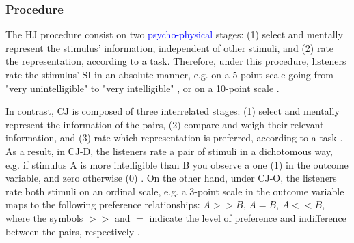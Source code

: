 \subsubsection{Procedure} \label{ss_sect:proc}
%
The HJ procedure consist on two \textcolor{blue}{psycho-physical} stages: (1) select and mentally represent the stimulus' information, independent of other stimuli, and (2) rate the representation, according to a task. Therefore, under this procedure, listeners rate the stimulus' SI in an absolute manner, e.g. on a 5-point scale going from "very unintelligible" to "very intelligible" \citep{Lagerberg_et_al_2014, Cox_et_al_1989}, or on a 10-point scale \citep{Faes_et_al_2021, Boonen_et_al_2021}.

In contrast, CJ is composed of three interrelated stages: (1) select and mentally represent the information of the pairs, (2) compare and weigh their relevant information, and (3) rate which representation is preferred, according to a task \citep{vanDaal_2020}. As a result, in CJ-D, the listeners rate a pair of stimuli in a dichotomous way, e.g. if stimulus A is more intelligible than B you observe a one (1) in the outcome variable, and zero otherwise (0) \citep{Bradley_et_al_1952}. On the other hand, under CJ-O, the listeners rate both stimuli on an ordinal scale, e.g. a 3-point scale in the outcome variable maps to the following preference relationships: $A>>B$, $A=B$, $A<<B$, where the symbols $>>$ and $=$ indicate the level of preference and indifference between the pairs, respectively \citep{Tutz_1986, Agresti_1992}.

